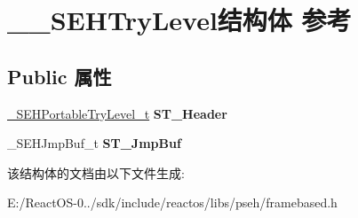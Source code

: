\hypertarget{struct_____s_e_h_try_level}{}\section{\+\_\+\+\_\+\+S\+E\+H\+Try\+Level结构体 参考}
\label{struct_____s_e_h_try_level}
\subsection*{Public 属性}
\begin{DoxyCompactItemize}
\item 
\mbox{\label{struct_____s_e_h_try_level_aaaaf65f5677b1c21d6f2841849e08026}} 
\hyperlink{struct_____s_e_h_portable_try_level}{\+\_\+\+S\+E\+H\+Portable\+Try\+Level\+\_\+t} {\bfseries S\+T\+\_\+\+Header}
\item 
\mbox{\label{struct_____s_e_h_try_level_a70a27e61234f36090527cda8c49bf9bd}} 
\+\_\+\+S\+E\+H\+Jmp\+Buf\+\_\+t {\bfseries S\+T\+\_\+\+Jmp\+Buf}
\end{DoxyCompactItemize}


该结构体的文档由以下文件生成\+:\begin{DoxyCompactItemize}
\item 
E\+:/\+React\+O\+S-\/0../sdk/include/reactos/libs/pseh/framebased.\+h\end{DoxyCompactItemize}
